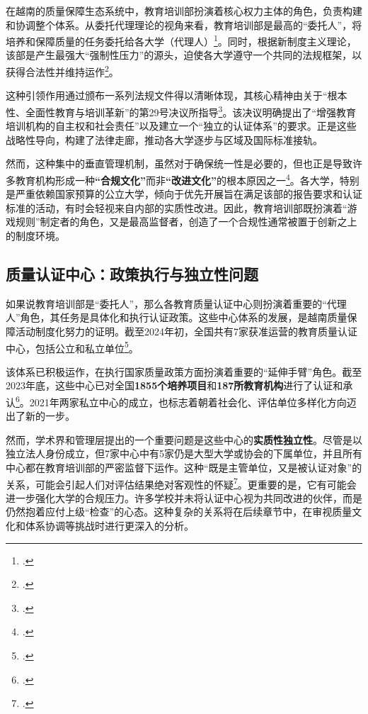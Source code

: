 在越南的质量保障生态系统中，教育培训部扮演着核心权力主体的角色，负责构建和协调整个体系。从委托代理理论的视角来看，教育培训部是最高的“委托人”，将培养和保障质量的任务委托给各大学（代理人）\footcite{Kivisto2008}。同时，根据新制度主义理论，该部是产生最强大“强制性压力”的源头，迫使各大学遵守一个共同的法规框架，以获得合法性并维持运作\footcite{MeyerPowell2020}。

这种引领作用通过颁布一系列法规文件得以清晰体现，其核心精神由关于“根本性、全面性教育与培训革新”的第29号决议所指导\footcite{nghi_quyet_29_2013}。该决议明确提出了“增强教育培训机构的自主权和社会责任”以及建立一个“独立的认证体系”的要求。正是这些战略性导向，构建了法律走廊，推动各大学逐步与区域及国际标准接轨。

然而，这种集中的垂直管理机制，虽然对于确保统一性是必要的，但也正是导致许多教育机构形成一种\textbf{“合规文化”}而非\textbf{“改进文化”}的根本原因之一\footcite{pham2021governance}。各大学，特别是严重依赖国家预算的公立大学，倾向于优先开展旨在满足该部的报告要求和认证标准的活动，有时会轻视来自内部的实质性改进。因此，教育培训部既扮演着“游戏规则”制定者的角色，又是最高监督者，创造了一个合规性通常被置于创新之上的制度环境。

\subsection{质量认证中心：政策执行与独立性问题}
\label{subsec:vai_tro_trungtamkd}

如果说教育培训部是“委托人”，那么各教育质量认证中心则扮演着重要的“代理人”角色，其任务是具体化和执行认证政策。这些中心体系的发展，是越南质量保障活动制度化努力的证明。截至2024年初，全国共有7家获准运营的教育质量认证中心，包括公立和私立单位\footcite{tuoitre_kdcl_stats_2024}。

该体系已积极运作，在执行国家质量政策方面扮演着重要的“延伸手臂”角色。截至2023年底，这些中心已对全国\textbf{1855个培养项目}和\textbf{187所教育机构}进行了认证和承认\footcite{tuoitre_kdcl_stats_2024}。2021年两家私立中心的成立，也标志着朝着社会化、评估单位多样化方向迈出了新的一步。

然而，学术界和管理层提出的一个重要问题是这些中心的\textbf{实质性独立性}。尽管是以独立法人身份成立，但7家中心中有5家仍是大型大学或协会的下属单位，并且所有中心都在教育培训部的严密监督下运作。这种“既是主管单位，又是被认证对象”的关系，可能会引起人们对评估结果绝对客观性的怀疑\footcite{giaoducnet_kdcl_list_2023}。更重要的是，它有可能会进一步强化大学的合规压力。许多学校并未将认证中心视为共同改进的伙伴，而是仍然抱着应付上级“检查”的心态。这种复杂的关系将在后续章节中，在审视质量文化和体系协调等挑战时进行更深入的分析。


